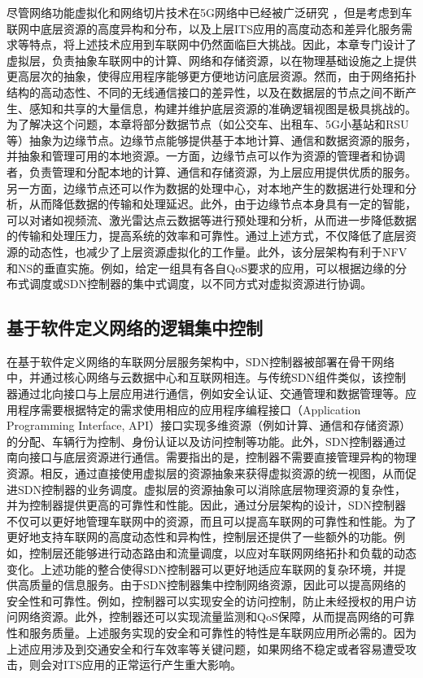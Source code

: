 尽管网络功能虚拟化和网络切片技术在5G网络中已经被广泛研究 \cite{zhu2021wang}，但是考虑到车联网中底层资源的高度异构和分布，以及上层ITS应用的高度动态和差异化服务需求等特点，将上述技术应用到车联网中仍然面临巨大挑战。因此，本章专门设计了虚拟层，负责抽象车联网中的计算、网络和存储资源，以在物理基础设施之上提供更高层次的抽象，使得应用程序能够更方便地访问底层资源。然而，由于网络拓扑结构的高动态性、不同的无线通信接口的差异性，以及在数据层的节点之间不断产生、感知和共享的大量信息，构建并维护底层资源的准确逻辑视图是极具挑战的。为了解决这个问题，本章将部分数据节点（如公交车、出租车、5G小基站和RSU等）抽象为边缘节点。边缘节点能够提供基于本地计算、通信和数据资源的服务，并抽象和管理可用的本地资源。一方面，边缘节点可以作为资源的管理者和协调者，负责管理和分配本地的计算、通信和存储资源，为上层应用提供优质的服务。另一方面，边缘节点还可以作为数据的处理中心，对本地产生的数据进行处理和分析，从而降低数据的传输和处理延迟。此外，由于边缘节点本身具有一定的智能，可以对诸如视频流、激光雷达点云数据等进行预处理和分析，从而进一步降低数据的传输和处理压力，提高系统的效率和可靠性。通过上述方式，不仅降低了底层资源的动态性，也减少了上层资源虚拟化的工作量。此外，该分层架构有利于NFV和NS的垂直实施。例如，给定一组具有各自QoS要求的应用，可以根据边缘的分布式调度或SDN控制器的集中式调度，以不同方式对虚拟资源进行协调。

\subsection{基于软件定义网络的逻辑集中控制}

在基于软件定义网络的车联网分层服务架构中，SDN控制器被部署在骨干网络中，并通过核心网络与云数据中心和互联网相连。与传统SDN组件类似，该控制器通过北向接口与上层应用进行通信，例如安全认证、交通管理和数据管理等。应用程序需要根据特定的需求使用相应的应用程序编程接口（Application Programming Interface, API）接口实现多维资源（例如计算、通信和存储资源）的分配、车辆行为控制、身份认证以及访问控制等功能。此外，SDN控制器通过南向接口与底层资源进行通信。需要指出的是，控制器不需要直接管理异构的物理资源。相反，通过直接使用虚拟层的资源抽象来获得虚拟资源的统一视图，从而促进SDN控制器的业务调度。虚拟层的资源抽象可以消除底层物理资源的复杂性，并为控制器提供更高的可靠性和性能。因此，通过分层架构的设计，SDN控制器不仅可以更好地管理车联网中的资源，而且可以提高车联网的可靠性和性能。为了更好地支持车联网的高度动态性和异构性，控制层还提供了一些额外的功能。例如，控制层还能够进行动态路由和流量调度，以应对车联网网络拓扑和负载的动态变化。上述功能的整合使得SDN控制器可以更好地适应车联网的复杂环境，并提供高质量的信息服务。由于SDN控制器集中控制网络资源，因此可以提高网络的安全性和可靠性。例如，控制器可以实现安全的访问控制，防止未经授权的用户访问网络资源。此外，控制器还可以实现流量监测和QoS保障，从而提高网络的可靠性和服务质量。上述服务实现的安全和可靠性的特性是车联网应用所必需的。因为上述应用涉及到交通安全和行车效率等关键问题，如果网络不稳定或者容易遭受攻击，则会对ITS应用的正常运行产生重大影响。


